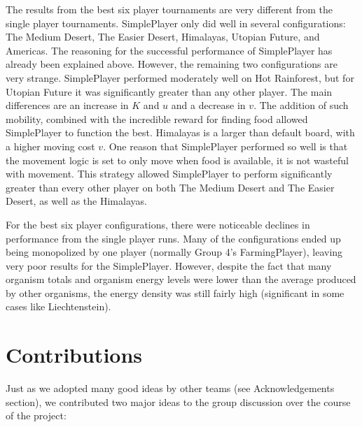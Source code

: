 \documentclass[
10pt, %
letterpaper, %
oneside, %
headinclude,footinclude, %
english
]{article}
\begin{document}
The results from the best six player tournaments are very different from the single player tournaments. SimplePlayer only did well in several configurations: The Medium Desert, The Easier Desert, Himalayas, Utopian Future, and Americas. The reasoning for the successful performance of SimplePlayer has already been explained above. However, the remaining two configurations are very strange. SimplePlayer performed moderately well on Hot Rainforest, but for Utopian Future it was significantly greater than any other player. The main differences are an increase in $K$ and $u$ and a decrease in $v$. The addition of such mobility, combined with the incredible reward for finding food allowed SimplePlayer to function the best. Himalayas is a larger than default board, with a higher moving cost $v$. One reason that SimplePlayer performed so well is that the movement logic is set to only move when food is available, it is not wasteful with movement. This strategy allowed SimplePlayer to perform significantly greater than every other player on both The Medium Desert and The Easier Desert, as well as the Himalayas.

For the best six player configurations, there were noticeable declines in performance from the single player runs. Many of the configurations ended up being monopolized by one player (normally Group 4's FarmingPlayer), leaving very poor results for the SimplePlayer. However, despite the fact that many organism totals and organism energy levels were lower than the average produced by other organisms, the energy density was still fairly high (significant in some cases like Liechtenstein).



\section{Contributions}

Just as we adopted many good ideas by other teams (see Acknowledgements section), we contributed two major ideas to the group discussion over the course of the project:
\end{document}
